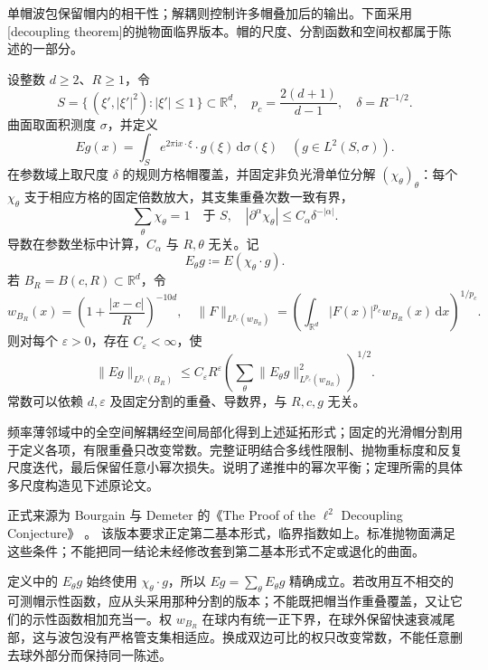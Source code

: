 单帽波包保留帽内的相干性；解耦则控制许多帽叠加后的输出。下面采用[decoupling theorem]的抛物面临界版本。帽的尺度、分割函数和空间权都属于陈述的一部分。

\begin{theorem}\label{b2:thm:25-decoupling}
设整数 \(d\geq2\)、\(R\geq1\)，令
\[
 S=\{\,(\xi',|\xi'|^2):|\xi'|\leq1\,\}\subset\mathbb R^d,\quad
 p_c=\frac{2(d+1)}{d-1},\quad \delta=R^{-1/2}.
\]
曲面取面积测度 \(\sigma\)，并定义
\[
 Eg(x)=\int_Se^{2\pi\mathrm i x\cdot\xi}
       \cdot g(\xi)\,\mathrm d\sigma(\xi)
 \quad(g\in L^2(S,\sigma)).
\]
在参数域上取尺度 \(\delta\) 的规则方格帽覆盖，并固定非负光滑单位分解 \((\chi_\theta)_\theta\)：每个 \(\chi_\theta\) 支于相应方格的固定倍数放大，其支集重叠次数一致有界，
\[
 \sum_\theta\chi_\theta=1\quad\text{于 }S,\quad
 |\partial^\alpha\chi_\theta|\leq C_\alpha\delta^{-|\alpha|}.
\]
导数在参数坐标中计算，\(C_\alpha\) 与 \(R,\theta\) 无关。记
\[
 E_\theta g\coloneqq E(\chi_\theta\cdot g).
\]
若 \(B_R=B(c,R)\subset\mathbb R^d\)，令
\[
 w_{B_R}(x)=\left(1+\frac{|x-c|}{R}\right)^{-10d},\quad
 \|F\|_{L^{p_c}(w_{B_R})}
 =\left(\int_{\mathbb R^d}|F(x)|^{p_c}
          w_{B_R}(x)\,\mathrm dx\right)^{1/p_c}.
\]
则对每个 \(\varepsilon>0\)，存在 \(C_\varepsilon<\infty\)，使
\[
 \|Eg\|_{L^{p_c}(B_R)}
 \leq C_\varepsilon R^\varepsilon
       \left(\sum_\theta
          \|E_\theta g\|_{L^{p_c}(w_{B_R})}^2
       \right)^{1/2}.
\]
常数可以依赖 \(d,\varepsilon\) 及固定分割的重叠、导数界，与 \(R,c,g\) 无关。
\end{theorem}
\begin{proofsketch}
频率薄邻域中的全空间解耦经空间局部化得到上述延拓形式；固定的光滑帽分割用于定义各项，有限重叠只改变常数。完整证明结合多线性限制、抛物重标度和反复尺度迭代，最后保留任意小幂次损失。说明了递推中的幂次平衡；定理所需的具体多尺度构造见下述原论文。

正式来源为 Bourgain 与 Demeter 的《The Proof of the \(\ell^2\) Decoupling Conjecture》%
\cite[Theorem 1.1; equation (7), pp.~352--355]{BourgainDemeter2015Proof}。
该版本要求正定第二基本形式，临界指数如上。标准抛物面满足这些条件；不能把同一结论未经修改套到第二基本形式不定或退化的曲面。
\end{proofsketch}

定义中的 \(E_\theta g\) 始终使用 \(\chi_\theta\cdot g\)，所以
\(Eg=\sum_\theta E_\theta g\) 精确成立。若改用互不相交的可测帽示性函数，应从头采用那种分割的版本；不能既把帽当作重叠覆盖，又让它们的示性函数相加充当一。权 \(w_{B_R}\) 在球内有统一正下界，在球外保留快速衰减尾部，这与波包没有严格管支集相适应。换成双边可比的权只改变常数，不能任意删去球外部分而保持同一陈述。

